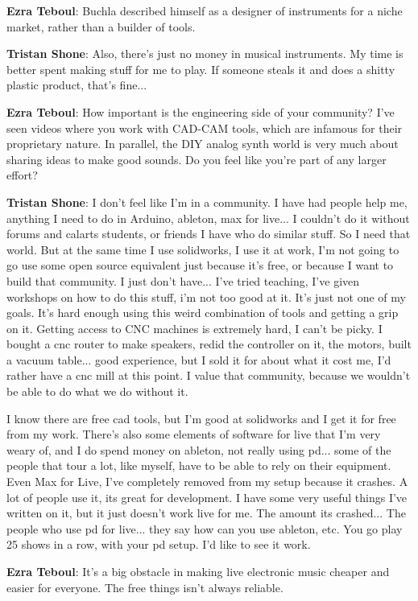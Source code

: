 \textbf{Ezra Teboul}: Buchla described himself as a designer of instruments for a niche market, rather than a builder of tools. 

\textbf{Tristan Shone}: Also, there's just no money in musical instruments. My time is better spent making stuff for me to play. If someone steals it and does a shitty plastic product, that's fine... 

\textbf{Ezra Teboul}: How important is the engineering side of your community? I've seen videos where you work with CAD-CAM tools, which are infamous for their proprietary nature. In parallel, the DIY analog synth world is very much about sharing ideas to make good sounds. Do you feel like you're part of any larger effort? 

\textbf{Tristan Shone}: I don't feel like I'm in a community. I have had people help me, anything I need to do in Arduino, ableton, max for live... I couldn't do it without forums and calarts students, or friends I have who do similar stuff. So I need that world. But at the same time I use solidworks, I use it at work, I'm not going to go use some open source equivalent just because it's free, or because I want to build that community. I just don't have... I've tried teaching, I've given workshops on how to do this stuff, i'm not too good at it. It's just not one of my goals. It's hard enough using this weird combination of tools and getting a grip on it. Getting access to CNC machines is extremely hard, I can't be picky. I bought a cnc router to make speakers, redid the controller on it, the motors, built a vacuum table... good experience, but I sold it for about what it cost me, I'd rather have a cnc mill at this point. I value that community, because we wouldn't be able to do what we do without it. 

I know there are free cad tools, but I'm good at solidworks and I get it for free from my work. There's also some elements of software for live that I'm very weary of, and I do spend money on ableton, not really using pd... some of the people that tour a lot, like myself, have to be able to rely on their equipment. Even Max for Live, I've completely removed from my setup because it crashes. A lot of people use it, its great for development. I have some very useful things I've written on it, but it just doesn't work live for me. The amount its crashed... The people who use pd for live... they say how can you use ableton, etc. You go play 25 shows in a row, with your pd setup. I'd like to see it work. 

\textbf{Ezra Teboul}: It's a big obstacle in making live electronic music cheaper and easier for everyone. The free things isn't always reliable.

